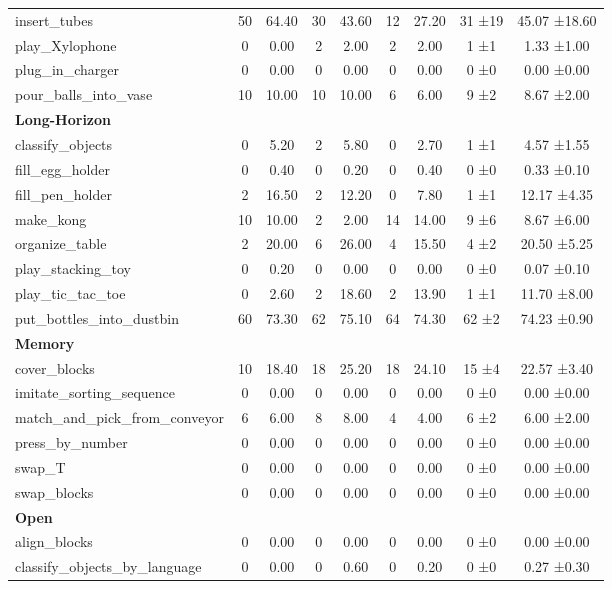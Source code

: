 \begin{table}[H]
{\begin{tabular}{l|c|c|c|c|c|c|c|c}
insert\_tubes & 50 & 64.40 & 30 & 43.60 & 12 & 27.20 & 31 ±19 & 45.07 ±18.60 \\
play\_Xylophone & 0 & 0.00 & 2 & 2.00 & 2 & 2.00 & 1 ±1 & 1.33 ±1.00 \\
plug\_in\_charger & 0 & 0.00 & 0 & 0.00 & 0 & 0.00 & 0 ±0 & 0.00 ±0.00 \\
pour\_balls\_into\_vase & 10 & 10.00 & 10 & 10.00 & 6 & 6.00 & 9 ±2 & 8.67 ±2.00 \\
\hline
\multicolumn{9}{l}{\textbf{Long-Horizon}} \\
classify\_objects & 0 & 5.20 & 2 & 5.80 & 0 & 2.70 & 1 ±1 & 4.57 ±1.55 \\
fill\_egg\_holder & 0 & 0.40 & 0 & 0.20 & 0 & 0.40 & 0 ±0 & 0.33 ±0.10 \\
fill\_pen\_holder & 2 & 16.50 & 2 & 12.20 & 0 & 7.80 & 1 ±1 & 12.17 ±4.35 \\
make\_kong & 10 & 10.00 & 2 & 2.00 & 14 & 14.00 & 9 ±6 & 8.67 ±6.00 \\
organize\_table & 2 & 20.00 & 6 & 26.00 & 4 & 15.50 & 4 ±2 & 20.50 ±5.25 \\
play\_stacking\_toy & 0 & 0.20 & 0 & 0.00 & 0 & 0.00 & 0 ±0 & 0.07 ±0.10 \\
play\_tic\_tac\_toe & 0 & 2.60 & 2 & 18.60 & 2 & 13.90 & 1 ±1 & 11.70 ±8.00 \\
put\_bottles\_into\_dustbin & 60 & 73.30 & 62 & 75.10 & 64 & 74.30 & 62 ±2 & 74.23 ±0.90 \\
\hline
\multicolumn{9}{l}{\textbf{Memory}} \\
cover\_blocks & 10 & 18.40 & 18 & 25.20 & 18 & 24.10 & 15 ±4 & 22.57 ±3.40 \\
imitate\_sorting\_sequence & 0 & 0.00 & 0 & 0.00 & 0 & 0.00 & 0 ±0 & 0.00 ±0.00 \\
match\_and\_pick\_from\_conveyor & 6 & 6.00 & 8 & 8.00 & 4 & 4.00 & 6 ±2 & 6.00 ±2.00 \\
press\_by\_number & 0 & 0.00 & 0 & 0.00 & 0 & 0.00 & 0 ±0 & 0.00 ±0.00 \\
swap\_T & 0 & 0.00 & 0 & 0.00 & 0 & 0.00 & 0 ±0 & 0.00 ±0.00 \\
swap\_blocks & 0 & 0.00 & 0 & 0.00 & 0 & 0.00 & 0 ±0 & 0.00 ±0.00 \\
\hline
\multicolumn{9}{l}{\textbf{Open}} \\
align\_blocks & 0 & 0.00 & 0 & 0.00 & 0 & 0.00 & 0 ±0 & 0.00 ±0.00 \\
classify\_objects\_by\_language & 0 & 0.00 & 0 & 0.60 & 0 & 0.20 & 0 ±0 & 0.27 ±0.30 \\

\end{tabular}}
\end{table}
